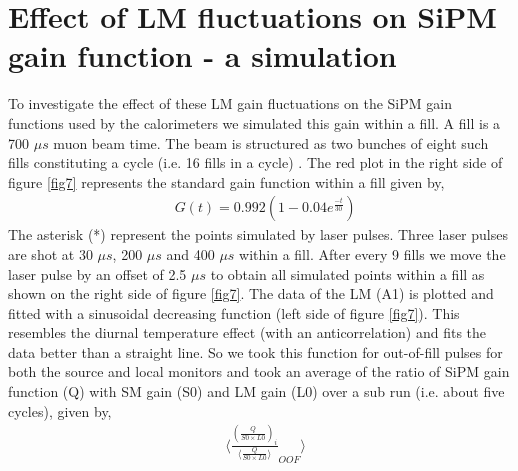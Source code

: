 \documentclass[article,accept,moreauthors,pdftex,10pt,a4paper]{Definitions/mdpi}
\begin{document}
\section{Effect of LM fluctuations on SiPM gain function - a simulation}
To investigate the effect of these LM gain fluctuations on the SiPM gain 
functions used by the calorimeters we simulated this gain within a fill. 
A fill is a 700 $\mu s$ muon beam time. The beam is structured as 
two bunches of eight such fills constituting a cycle (i.e. 16 fills in a cycle) \cite{TDR}. 
The red plot in the right side of figure \ref{fig7} represents the standard gain function 
within a fill given by,
\begin{equation}
\begin{aligned}
&G(t) = 0.992(1-0.04e^{\frac{-t}{30}})
\end{aligned}
\end{equation}  
The asterisk (*) represent the points simulated by laser pulses. 
Three laser pulses are shot at 30 $\mu s$, 200 $\mu s$ and 400 $\mu s$ 
within a fill. After every 9 fills we move the laser pulse by an offset of 
2.5 $\mu s$ to obtain all simulated points within a fill as shown on the 
right side of figure \ref{fig7}. The data of the LM (A1) is plotted and 
fitted with a sinusoidal decreasing function (left side of figure \ref{fig7}). 
This resembles the diurnal temperature effect (with an anticorrelation) and fits the data better than 
a straight line. So we took this function for out-of-fill pulses for both the source 
and local monitors and took an average of the ratio of SiPM gain function (Q) with 
SM gain (S0) and LM gain (L0) over a sub run (i.e. about five cycles), given by,
\begin{equation}	
                       \begin{aligned}	
                       &\Bigg \langle \frac {(\frac{Q}{S0\times L0})_{i}}{\langle {\frac{Q}{S0\times L0}}\rangle}_{OOF}\Bigg \rangle	
                       \end{aligned}
\end{equation}  
  
\end{document}
